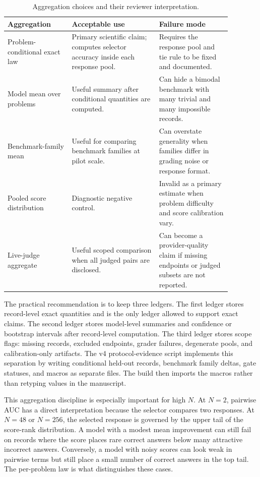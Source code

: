 \begin{table}[t]
\centering
\small
\caption{Aggregation choices and their reviewer interpretation.}
\label{tab:aggregation-risks}
\begin{tabular}{p{0.25\linewidth}p{0.34\linewidth}p{0.29\linewidth}}
\toprule
Aggregation & Acceptable use & Failure mode \\
\midrule
Problem-conditional exact law &
Primary scientific claim; computes selector accuracy inside each response pool. &
Requires the response pool and tie rule to be fixed and documented. \\
Model mean over problems &
Useful summary after conditional quantities are computed. &
Can hide a bimodal benchmark with many trivial and many impossible records. \\
Benchmark-family mean &
Useful for comparing benchmark families at pilot scale. &
Can overstate generality when families differ in grading noise or response
format. \\
Pooled score distribution &
Diagnostic negative control. &
Invalid as a primary estimate when problem difficulty and score calibration
vary. \\
Live-judge aggregate &
Useful scoped comparison when all judged pairs are disclosed. &
Can become a provider-quality claim if missing endpoints or judged subsets are
not reported. \\
\bottomrule
\end{tabular}
\end{table}

The practical recommendation is to keep three ledgers. The first ledger stores
record-level exact quantities and is the only ledger allowed to support exact
claims. The second ledger stores model-level summaries and confidence or
bootstrap intervals after record-level computation. The third ledger stores
scope flags: missing records, excluded endpoints, grader failures, degenerate
pools, and calibration-only artifacts. The v4 protocol-evidence script
implements this separation by writing conditional held-out records, benchmark
family deltas, gate statuses, and macros as separate files. The build then
imports the macros rather than retyping values in the manuscript.

This aggregation discipline is especially important for high $N$. At $N=2$,
pairwise AUC has a direct interpretation because the selector compares two
responses. At $N=48$ or $N=256$, the selected response is governed by the
upper tail of the score-rank distribution. A model with a modest mean
improvement can still fail on records where the score places rare correct
answers below many attractive incorrect answers. Conversely, a model with
noisy scores can look weak in pairwise terms but still place a small number of
correct answers in the top tail. The per-problem law is what distinguishes
these cases.

